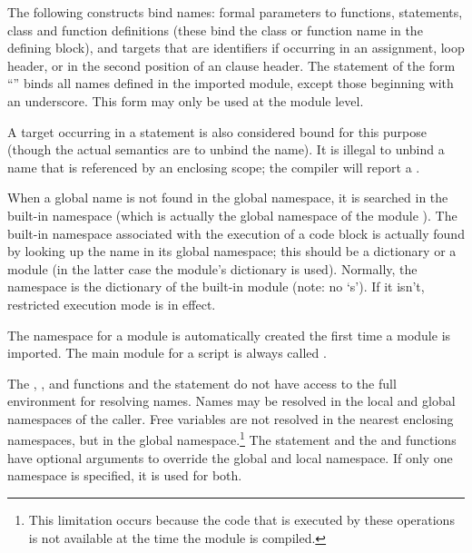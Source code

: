 The following constructs bind names: formal parameters to functions,
 statements, class and function definitions (these
bind the class or function name in the defining block), and targets
that are identifiers if occurring in an assignment,  loop
header, or in the second position of an  clause
header.  The  statement of the form ``'' binds all names defined in the
imported module, except those beginning with an underscore.  This form
may only be used at the module level.

A target occurring in a  statement is also considered bound
for this purpose (though the actual semantics are to unbind the
name).  It is illegal to unbind a name that is referenced by an
enclosing scope; the compiler will report a .

When a global name is not found in the global namespace, it is
searched in the built-in namespace (which is actually the global
namespace of the module ).  
The built-in namespace associated with the execution of a code block
is actually found by looking up the name  in its
global namespace; this should be a dictionary or a module (in the
latter case the module's dictionary is used).  Normally, the
 namespace is the dictionary of the built-in module
 (note: no `s').  If it isn't, restricted
execution mode is in effect.

The namespace for a module is automatically created the first time a
module is imported.  The main module for a script is always called
.

The , , and 
functions and the  statement do not have access to the
full environment for resolving names.  Names may be resolved in the
local and global namespaces of the caller.  Free variables are not
resolved in the nearest enclosing namespaces, but in the global
namespace.\footnote{This limitation occurs because the code that is
    executed by these operations is not available at the time the
    module is compiled.}
The  statement and the  and
 functions have optional arguments to override
the global and local namespace.  If only one namespace is specified,
it is used for both.

